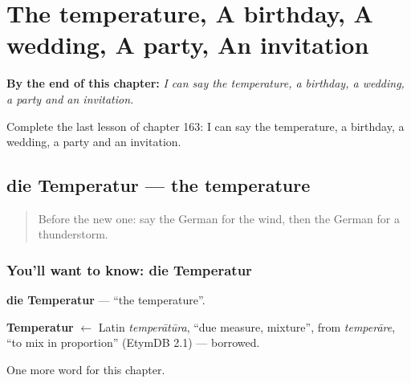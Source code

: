 
\chapter{The temperature, A birthday, A wedding, A party, An invitation}
\label{ch:ge-the-temperature-a-birthday-a-wedding-a-party-an-invitation}

\begin{chapteropening}
\textbf{By the end of this chapter:} \emph{I can say the temperature, a birthday, a wedding, a party and an invitation.}

Complete the last lesson of chapter 163: I can say the temperature, a birthday, a wedding, a party and an invitation.
\end{chapteropening}

\section[die Temperatur]{die Temperatur — the temperature}

\label{lesson:GE-C163-temperatur}



\begin{quote}
Before the new one: say the German for the wind, then the German for a thunderstorm.
\end{quote}

\subsection*{You'll want to know: die Temperatur}
\textbf{die Temperatur} — \textquotedblleft{}the temperature\textquotedblright{}.

\begin{cousinweb}
\textbf{Temperatur} $\leftarrow$ Latin \emph{temperātūra}, \textquotedblleft{}due measure, mixture\textquotedblright{}, from \emph{temperāre}, \textquotedblleft{}to mix in proportion\textquotedblright{} (EtymDB 2.1) — borrowed.
\end{cousinweb}

\begin{grammarlens}[title={What you've built}]
One more word for this chapter.
\end{grammarlens}

